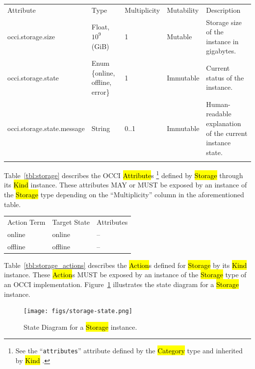 \documentclass[10pt,a4paper]{article}
\begin{document}
{
	\begin{tabular}{lp{2.5cm}p{1cm}lp{5cm}}
	\toprule
	Attribute&Type&Multi\-plicity&Mutability&Description\\
	\colrule
	occi.storage.size & Float, $10^9$ (GiB) & 1 & Mutable
	& Storage size of the instance in gigabytes.\\
	occi.storage.state & Enum \{online, off\-line, error\} & 1 & Immutable
	& Current status of the instance.\\
	occi.storage.state.message & String & 0..1 & Immutable
	& Human-readable explanation of the current instance state.\\
	\botrule
	\end{tabular}
}

Table~\ref{tbl:storage} describes the OCCI \hl{Attribute}s%
\footnote{See the ``{\tt attributes}'' attribute defined by the
  \hl{Category} type and inherited by \hl{Kind} \cite{occi:core}.}
defined by \hl{Storage} through its \hl{Kind} instance. These attributes
MAY or MUST be exposed by an instance of the \hl{Storage} type
depending on the ``Multiplicity'' column in the aforementioned table.

{
	\begin{tabular}{lll}
	\toprule
	Action Term&Target State&Attributes\\
	\colrule
	online & online & --\\
	offline & offline & --\\
	\end{tabular}
}

Table~\ref{tbl:storage_actions} describes the \hl{Action}s defined for
\hl{Storage} by its \hl{Kind} instance. These \hl{Action}s MUST be
exposed by an instance of the \hl{Storage} type of an OCCI
implementation.  Figure~\ref{fig:storage_state} illustrates the state
diagram for a \hl{Storage} instance.

\begin{figure}[!h]
	\centering
	\texttt{[image: figs/storage-state.png]}
	\caption{State Diagram for a \hl{Storage} instance.}
	\label{fig:storage_state}
\end{figure}
\end{document}
